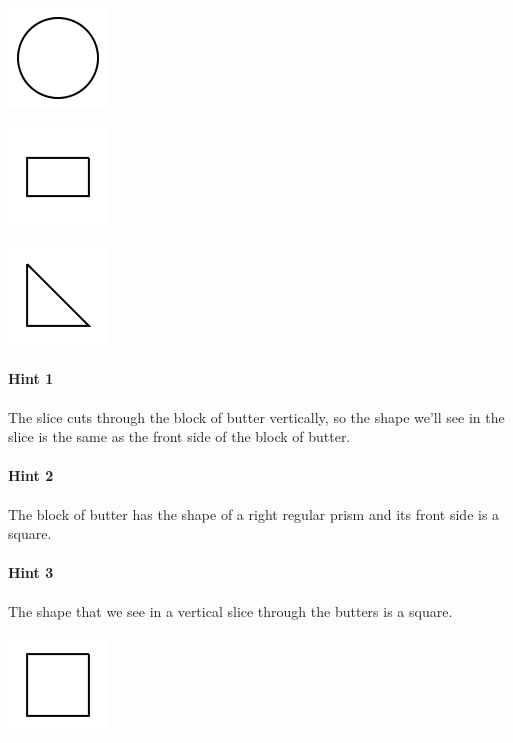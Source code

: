 \documentclass[twocolumn,10pt]{article}
\def\shrinkfactor{0.4}
\begin{document}
 
\includegraphics[scale=\shrinkfactor]{figures/9bf34a29bc62816f07057d9e571de844df484cd9.png}


\includegraphics[scale=\shrinkfactor]{figures/0e5042b475e0847d67b74c0482f8e8173f798656.png}


\includegraphics[scale=\shrinkfactor]{figures/02361468f7d85874956214c7a0a119b84a8c2651.png}



\paragraph{Hint 1}The slice cuts through the block of butter vertically, so the shape we'll see in the slice is the same as the front side of the block of butter.

\paragraph{Hint 2}The block of butter has the shape of a right regular prism and its front side is a square.

\paragraph{Hint 3}The shape that we see in a vertical slice through the  butters is a square.  

\includegraphics[scale=\shrinkfactor]{figures/4b59a0ece6acc7c19c389e1de534d1df93bf1169.png}
\end{document}
